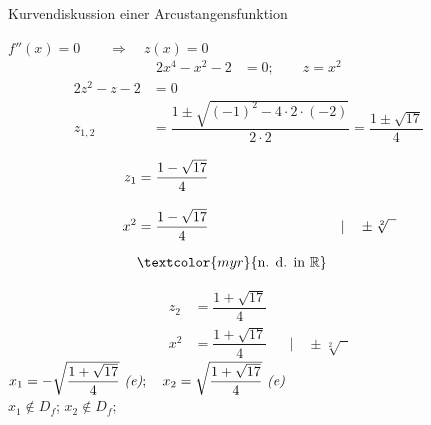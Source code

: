 \begin{Example}{Kurvendiskussion einer Arcustangensfunktion}{}
\begin{itemize}
        $f''(x) = 0 \qquad \Rightarrow \quad z(x) = 0$\\[-2.0ex]
        \begin{align*}
            2x^{4}-x^{2}-2 &= 0; \qquad z = x^{2}&&
        \end{align*}
        \begin{align*}
            2z^{2} - z - 2 &= 0 &&\\[1.5ex]
            z_{1, 2} &= \dfrac{1 \pm \sqrt{\left(-1\right)^{2} - 4 \cdot 2 \cdot \left(-2\right)}}{2 \cdot 2} = \dfrac{1 \pm \sqrt{17}}{4} &&
        \end{align*}
        \begin{minipage}[t]{0.4\linewidth}
            \begin{align*}
                z_{1} &= \dfrac{1 - \sqrt{17}}{4} &&\\[2.0ex]
                x^{2} &= \dfrac{1 - \sqrt{17}}{4} &&| \quad \pm \sqrt[2]{\phantom{x}}\\[1.5ex]
                & \textcolor{myr}{\text{n. d. in } \mathbb{R}} 
            \end{align*}
        \end{minipage}
        \hfill
        \vrule
        \hfill
        \begin{minipage}[t]{0.55\linewidth}
            \begin{align*}
                z_{2} &= \dfrac{1 + \sqrt{17}}{4} &&\\[2.0ex]
                x^{2} &= \dfrac{1 + \sqrt{17}}{4} &&| \quad \pm \sqrt[2]{\phantom{x}}
            \end{align*}
            $x_{1} = -\sqrt{\dfrac{1 + \sqrt{17}}{4}} \ \text{\textit{(e)}}; \quad x_{2} = \sqrt{\dfrac{1 + \sqrt{17}}{4}} \ \text{\textit{(e)}}$\\[2.0ex]
            $x_{1} \not\in D_{f}$; \quad $x_{2} \not\in D_{f}$;
        \end{minipage}\\[2.0ex]
        \begin{minipage}[t]{1.00\linewidth}
\end{minipage}
\end{itemize}
\end{Example}
